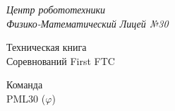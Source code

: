 \thispagestyle{titlestyle}
\begin{titlepage}
	\newpage
	
	\begin{center}
		\LARGE\textit{Центр робототехники \\ Физико-Математический Лицей №30}
		
		\vspace{8em}
		
		\LARGE{Техническая книга \\ Соревнований First FTC}
		
		\vspace{4em}
		
		Команда \\ PML30 (${\varphi}$)
		
	\end{center}
\end{titlepage}

\newpage
